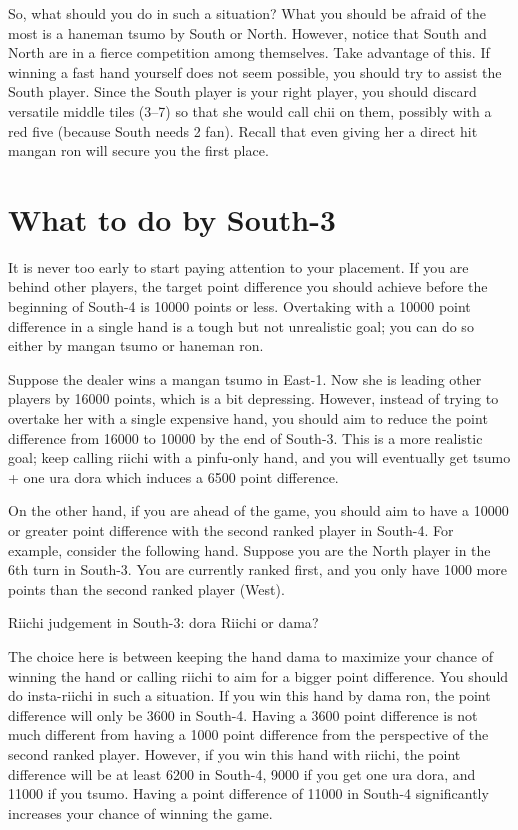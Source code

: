 \bigskip
So, what should you do in such a situation? 
What you should be afraid of the most is a {\jap haneman tsumo} by South or North. However, notice that South and North are in a fierce competition among themselves. Take advantage of this. If winning a fast hand yourself does not seem possible, you should try to assist the South player. Since the South player is your right player, you should discard versatile middle tiles (3--7) so that she would call {\jap chii} on them, possibly with a red five (because South needs 2 {\jap fan}). Recall that even giving her a direct hit {\jap mangan ron} will secure you the first place. 

\section{What to do by South-3}
It is never too early to start paying attention to your placement. If you are behind other players, the target point difference you should achieve before the beginning of South-4 is 10000 points or less. Overtaking with a 10000 point difference in a single hand is a tough but not unrealistic goal; you can do so either by {\jap mangan tsumo} or {\jap haneman ron}. 

\bigskip
Suppose the dealer wins a {\jap mangan tsumo} in East-1. Now she is leading other players by 16000 points, which is a bit depressing. However, instead of trying to overtake her with a single expensive hand, you should aim to reduce the point difference from 16000 to 10000 by the end of South-3. This is a more realistic goal; keep calling {\jap riichi} with a {\jap pinfu}-only hand, and you will eventually get {\jap tsumo} + one {\jap ura dora} which induces a 6500 point difference. 

\bigskip
On the other hand, if you are ahead of the game, you should aim to have a 10000 or greater point difference with the second ranked player in South-4. 
For example, consider the following hand. Suppose you are the North player in the 6th turn in South-3. You are currently ranked first, and you only have 1000 more points than the second ranked player (West). 

\bigskip
\begin{itembox}[r]{{\jap Riichi} judgement in South-3: {\jap dora} {\large{}}}
\bp
{}\bei
\ep
\vspace{-10pt}
{\jap Riichi} or {\jap dama}?
\end{itembox}
\noindent The choice here is between keeping the hand {\jap dama} to maximize your chance of winning the hand or calling {\jap riichi} to aim for a bigger point difference. 
You should do insta-{\jap riichi} in such a situation. If you win this hand by {\jap dama ron}, the point difference will only be 3600 in South-4. Having a 3600 point difference is not much different from having a 1000 point difference from the perspective of the second ranked player. However, if you win this hand with {\jap riichi}, the point difference will be at least 6200 in South-4, 9000 if you get one {\jap ura dora}, and 11000 if you {\jap tsumo}. Having a point difference of 11000 in South-4 significantly increases your chance of winning the game. 

